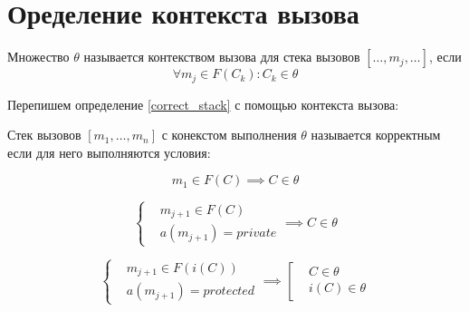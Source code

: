 \documentclass[graybox]{svmult}
\begin{document}
\section{Оределение контекста вызова}
\label{sec:2}
\begin{definition}
\label{context}
Множество $\theta$ называется контекством вызова для стека вызовов $[\dots, m_j, \dots]$, если 
\begin{equation}
\forall m_j \in F(C_k): C_k \in \theta
\end{equation}
\end{definition}

Перепишем определение \ref{correct_stack} с помощью контекста вызова:
\begin{definition}
\label{correct_stack_with_context}
Стек вызовов $[m_1, \dots, m_n]$ с конекстом выполнения $\theta$ называется корректным если для него выполняются условия:

\begin{equation}
\label{first_method_public_with_context}
m_1 \in F(C) \implies C \in \theta
\end{equation}

\begin{equation}
\label{private_with_context}
\left\{
\begin{aligned}
&m_{j+1} \in F(C) \\
&a(m_{j+1}) = private
\end{aligned}
\right. 
\implies C \in \theta
\end{equation}

\begin{equation}
\label{protected_with_context}
\left\{
	\begin{aligned}
		&m_{j+1} \in F(i(C)) \\
		&a(m_{j+1}) = protected
	\end{aligned}
\right.
\implies
\left[
	\begin{aligned}
		&C \in \theta \\
		&i(C) \in \theta
	\end{aligned}
\right.
\end{equation}

\end{definition}
\end{document}
